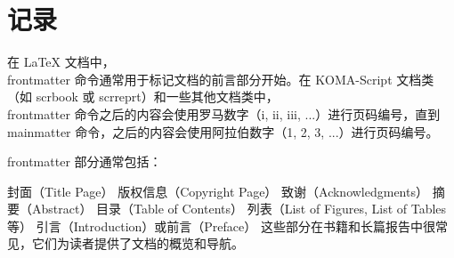 \chapter{记录}
在 LaTeX 文档中，\\frontmatter 命令通常用于标记文档的前言部分开始。在 KOMA-Script 文档类（如 scrbook 或 scrreprt）和一些其他文档类中，\\frontmatter 命令之后的内容会使用罗马数字（i, ii, iii, ...）进行页码编号，直到 \\mainmatter 命令，之后的内容会使用阿拉伯数字（1, 2, 3, ...）进行页码编号。

frontmatter 部分通常包括：

封面（Title Page）
版权信息（Copyright Page）
致谢（Acknowledgments）
摘要（Abstract）
目录（Table of Contents）
列表（List of Figures, List of Tables 等）
引言（Introduction）或前言（Preface）
这些部分在书籍和长篇报告中很常见，它们为读者提供了文档的概览和导航。